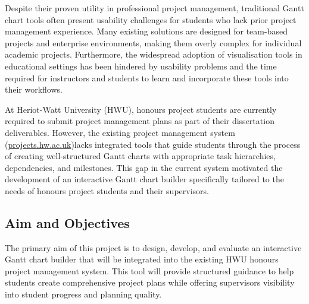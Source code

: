\documentclass[12pt,nonacm,acmlarge,titlepage,screen]{acmart}
\begin{document}
Despite their proven utility in professional project management, traditional Gantt chart tools often present usability challenges for students who lack prior project management experience. Many existing solutions are designed for team-based projects and enterprise environments, making them overly complex for individual academic projects. Furthermore, the widespread adoption of visualisation tools in educational settings has been hindered by usability problems and the time required for instructors and students to learn and incorporate these tools into their workflows.


At Heriot-Watt University (HWU), honours project students are currently required to submit project management plans as part of their dissertation deliverables. However, the existing project management system (\href{https://projects.hw.ac.uk/}{projects.hw.ac.uk})lacks integrated tools that guide students through the process of creating well-structured Gantt charts with appropriate task hierarchies, dependencies, and milestones. This gap in the current system motivated the development of an interactive Gantt chart builder specifically tailored to the needs of honours project students and their supervisors.


\subsection{Aim and Objectives} \label{sec:intro_aim}


The primary aim of this project is to design, develop, and evaluate an interactive Gantt chart builder that will be integrated into the existing HWU honours project management system. This tool will provide structured guidance to help students create comprehensive project plans while offering supervisors visibility into student progress and planning quality.
\end{document}
